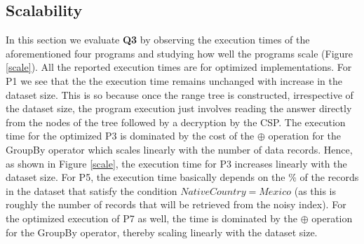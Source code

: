 \subsection{Scalability}
In this section we evaluate \textbf{Q3} by observing the execution times of the aforementioned four \system programs and studying how well the programs scale (Figure \ref{scale}). All the reported execution times are for optimized implementations. For P1 we see that the the execution time remains unchanged with increase in the dataset size. This is so because once the range tree is constructed, irrespective of the dataset size, the program execution just involves reading the answer directly from the nodes of the tree followed by a decryption by the \textsf{CSP}. The execution time for the optimized P3 is dominated by the cost of the $\oplus$ operation for the \textsf{GroupBy} operator which scales linearly with the number of data records. Hence, as shown in Figure \ref{scale}, the execution time for P3 increases linearly with the dataset size. For P5, the execution time basically depends on the \% of the records in the dataset that satisfy the condition $NativeCountry=Mexico$ (as this is roughly the number of records that will be retrieved from the noisy index). %
 For the optimized execution of P7  as well, the time is dominated by the $\oplus$ operation for the \textsf{GroupBy} operator, thereby scaling linearly with the dataset size.   %
